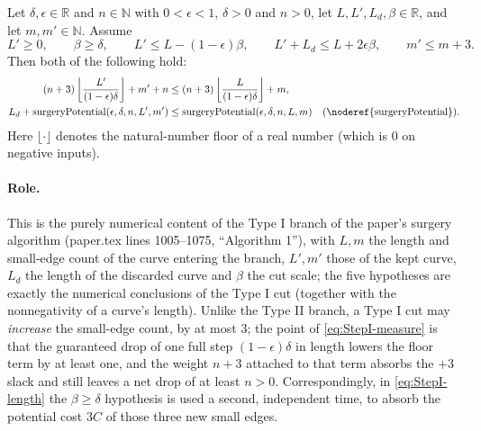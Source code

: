 \begin{helper}
  Let $\delta,\epsilon \in \mathbb{R}$ and $n \in \mathbb{N}$ with $0<\epsilon<1$, $\delta>0$ and
  $n>0$, let $L,L',L_d,\beta \in \mathbb{R}$, and let $m,m' \in \mathbb{N}$. Assume
  \[
    L' \ge 0
    , \qquad
    \beta \ge \delta
    , \qquad
    L' \le L - (1-\epsilon)\beta
    , \qquad
    L' + L_d \le L + 2\epsilon\beta
    , \qquad
    m' \le m + 3
    .
  \]
  Then both of the following hold:
  \begin{align}
    \label{eq:StepI-measure}
    (n+3)\left\lfloor \frac{L'}{(1-\epsilon)\delta} \right\rfloor + m' + n
      &\le (n+3)\left\lfloor \frac{L}{(1-\epsilon)\delta} \right\rfloor + m
    ,\\
    \label{eq:StepI-length}
    L_d + \mathrm{surgeryPotential}(\epsilon,\delta,n,L',m')
      &\le \mathrm{surgeryPotential}(\epsilon,\delta,n,L,m)
    \quad\text{(\noderef{surgeryPotential})}
    .
  \end{align}
  Here $\lfloor\cdot\rfloor$ denotes the natural-number floor of a real number (which is $0$ on
  negative inputs).

  \paragraph{Role.} This is the purely numerical content of the Type I branch of the paper's
  surgery algorithm (paper.tex lines 1005--1075, ``Algorithm 1''), with $L,m$ the length and
  small-edge count of the curve entering the branch, $L',m'$ those of the kept curve, $L_d$ the
  length of the discarded curve and $\beta$ the cut scale; the five hypotheses are exactly the
  numerical conclusions of the Type I cut (together with the nonnegativity of a curve's length).
  Unlike the Type II branch, a Type I cut may \emph{increase} the small-edge count, by at most $3$;
  the point of \eqref{eq:StepI-measure} is that the guaranteed drop of one full step
  $(1-\epsilon)\delta$ in length lowers the floor term by at least one, and the weight $n+3$
  attached to that term absorbs the $+3$ slack and still leaves a net drop of at least $n>0$.
  Correspondingly, in \eqref{eq:StepI-length} the $\beta\ge\delta$ hypothesis is used a second,
  independent time, to absorb the potential cost $3C$ of those three new small edges.
\end{helper}
